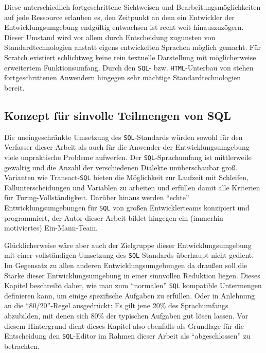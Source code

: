 Diese unterschiedlich fortgeschrittene Sichtweisen und Bearbeitungsmöglichkeiten auf jede Ressource erlauben es, den Zeitpunkt an dem ein Entwickler der Entwicklungsumgebung endgültig entwachsen ist recht weit hinauszuzögern. Dieser Umstand wird vor allem durch Entscheidung zugunsten von Standardtechnologien anstatt eigens entwickelten Sprachen möglich gemacht. Für Scratch existiert schlichtweg keine rein textuelle Darstellung mit möglicherweise erweitertem Funktionsumfang. Durch den \texttt{SQL}- bzw. \texttt{HTML}-Unterbau von \idename{} stehen fortgeschrittenen Anwendern hingegen sehr mächtige Standardtechnologien bereit.

\subsection{Konzept für sinvolle Teilmengen von SQL}
\label{sec:sql-subset}


Die uneingeschränkte Umsetzung des \texttt{SQL}-Standards würden sowohl für den Verfasser dieser Arbeit als auch für die Anwender der Entwicklungsumgebung viele unpraktische Probleme aufwerfen. Der \texttt{SQL}-Sprachumfang ist mittlerweile gewaltig und die Anzahl der verschiedenen Dialekte unüberschaubar groß. Varianten wie Transact-\texttt{SQL} bieten die Möglichkeit zur Laufzeit mit Schleifen, Fallunterscheidungen und Variablen zu arbeiten und erfüllen damit alle Kriterien für Turing-Vollständigkeit. Darüber hinaus werden ``echte'' Entwicklungsumgebungen für \texttt{SQL} von großen Entwicklerteams konzipiert und programmiert, der Autor dieser Arbeit bildet hingegen ein (immerhin motiviertes) Ein-Mann-Team.

Glücklicherweise wäre aber auch der Zielgruppe dieser Entwicklungsumgebung mit einer vollständigen Umsetzung des \texttt{SQL}-Standards überhaupt nicht gedient. Im Gegensatz zu allen anderen Entwicklungsumgebungen da draußen soll die Stärke dieser Entwicklungsumgebung in einer sinnvollen Reduktion liegen. Dieses Kapitel beschreibt daher, wie man zum ``normalen'' \texttt{SQL} kompatible Untermengen definieren kann, um einige spezifische Aufgaben zu erfüllen. Oder in Anlehnung an die "`80/20"'-Regel ausgedrückt: Es gilt jene 20\% des Sprachumfangs abzubilden, mit denen sich 80\% der typischen Aufgaben gut lösen lassen. Vor diesem Hintergrund dient dieses Kapitel also ebenfalls als Grundlage für die Entscheidung den \texttt{SQL}-Editor im Rahmen dieser Arbeit als "`abgeschlossen"' zu betrachten.

